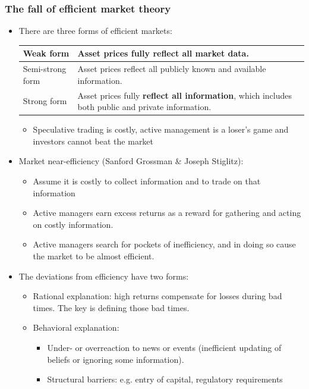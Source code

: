 \subsubsection{The fall of efficient market theory}
\begin{itemize}
\item There are three forms of efficient markets:
\begin{table}[htbp]
    \centering
    \begin{tabular}{@{}lp{8cm}@{}}
        \toprule
        Weak form & Asset prices fully reflect all market data. \\
        \midrule
        Semi-strong form & Asset prices reflect all publicly known and available information. \\
        \midrule
        Strong form & Asset prices fully \textbf{reflect all information}, which includes both public and private information. \\
        \bottomrule
    \end{tabular}
\end{table}
    \begin{itemize}
    \item Speculative trading is costly, active management is a loser's game and investors cannot beat the market
    \end{itemize}
\item Market near-efficiency (Sanford Grossman \& Joseph Stiglitz):
    \begin{itemize}
    \item Assume it is costly to collect information and to trade on that information
    \item Active managers earn excess returns as a reward for gathering and acting on costly information.
    \item Active managers search for pockets of inefficiency, and in doing so cause the market to be almost efficient.
    \end{itemize}
\item The deviations from efficiency have two forms:
    \begin{itemize}
    \item Rational explanation: high returns compensate for losses during bad times. The key is defining those bad times.
    \item Behavioral explanation:
        \begin{itemize}
        \item Under- or overreaction to news or events (inefficient updating of beliefs or ignoring some information).
        \item Structural barriers: e.g. entry of capital, regulatory requirements
        \end{itemize}
    \end{itemize}
\end{itemize}



